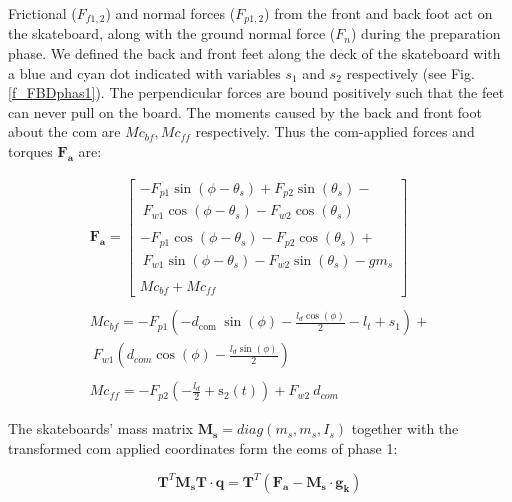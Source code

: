 \documentclass[default,iicol]{sn-jnl}
\begin{document}
Frictional ($F_{f1,2}$) and normal forces ($F_{p1,2}$) from the front and back foot act on the skateboard, along with the ground normal force ($F_n$) during the preparation phase. We defined the back and front feet along the deck of the skateboard with a blue and cyan dot indicated with variables $s_1$ and $s_2$ respectively (see Fig. \ref{f_FBDphas1}). The perpendicular forces are bound positively such that the feet can never pull on the board. The moments caused by the back and front foot about the \gls{com} are $Mc_{bf}, Mc_{ff}$ respectively. Thus the \gls{com}-applied forces and torques $\mathbf{F_{a}}$ are:
 
\begin{equation}\label{e_Fi}
\begin{array}{c}
    \mathbf{F_{a}}= \left[\begin{array}{l}
-F_{p 1} \sin \left(\phi-\theta_s\right)+F_{p 2} \sin \left(\theta_s\right)- \\ \ F_{w 1} \cos \left(\phi-\theta_s\right)-F_{w 2} \cos \left(\theta_s\right) \\ \\
-F_{p 1} \cos \left(\phi-\theta_s\right)-F_{p 2} \cos \left(\theta_s\right)+ \\ \ F_{w 1} \sin \left(\phi-\theta_s\right)-F_{w 2} \sin \left(\theta_s\right)-g m_s \\ \\
Mc_{bf} + Mc_{ff}
\end{array}\right] 
\\ \\
Mc_{bf} = -F_{p 1} (-d_{\text {com }} \sin (\phi)-\frac{l_d \cos (\phi)}{2}-l_t+s_1)+ \\ \ F_{w 1}(d_{c o m} \cos (\phi)-\frac{l_d \sin (\phi)}{2})
\\ \\
Mc_{ff} = -F_{p 2}\left(-\frac{l_d}{2}+\mathrm{s}_2(t)\right)+F_{w 2} \ d_{c o m}
\end{array}
\end{equation}  

The skateboards' mass matrix $\mathbf{M_s} = diag(m_s,m_s,I_s)$ together with the transformed \gls{com} applied coordinates form the \glspl{eom} of phase 1:

\begin{equation} \label{e_eoma}
    \mathbf{T}^T \mathbf{M_s} \mathbf{T} \cdot \mathbf{q} = \mathbf{T}^T (\mathbf{F_a} - \mathbf{M_s} \cdot \mathbf{g_k})
\end{equation}
\end{document}
